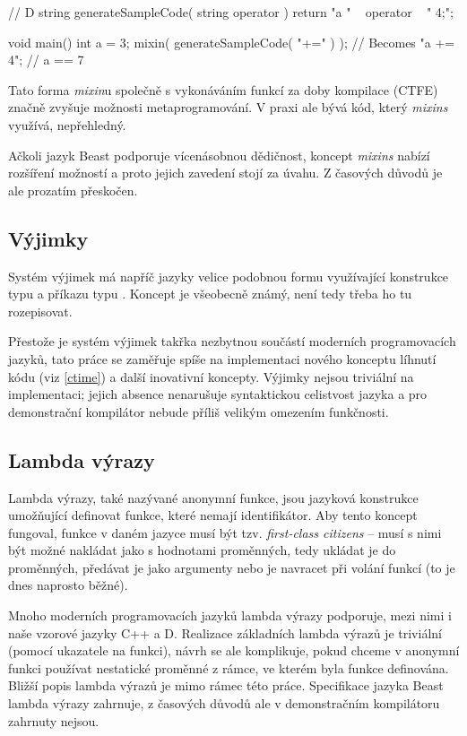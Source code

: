 \begin{dcode}
// D
string generateSampleCode( string operator ) {
	return "a " ~ operator ~ " 4;";
}

void main() {
	int a = 3;
	mixin( generateSampleCode( "+=" ) ); // Becomes "a += 4";
	// a == 7
}
\end{dcode}

Tato forma \textit{mixin}u společně s vykonáváním funkcí za doby kompilace (CTFE) značně zvyšuje možnosti metaprogramování. V praxi ale bývá kód, který \textit{mixins} využívá, nepřehledný.

Ačkoli jazyk Beast podporuje vícenásobnou dědičnost, koncept \textit{mixins} nabízí rozšíření možností a proto jejich zavedení stojí za úvahu. Z časových důvodů je ale prozatím přeskočen.

\subsection{Výjimky}
Systém výjimek má napříč jazyky velice podobnou formu využívající konstrukce typu  a příkazu typu . Koncept je všeobecně známý, není tedy třeba ho tu rozepisovat.

Přestože je systém výjimek takřka nezbytnou součástí moderních programovacích jazyků, tato práce se zaměřuje spíše na implementaci nového konceptu líhnutí kódu (viz \autoref{ctime}) a další inovativní koncepty. Výjimky nejsou triviální na implementaci; jejich absence nenarušuje syntaktickou celistvost jazyka a pro demonstrační kompilátor nebude příliš velikým omezením funkčnosti.

\subsection{Lambda výrazy}
Lambda výrazy, také nazývané anonymní funkce, jsou jazyková konstrukce umožňující definovat funkce, které nemají identifikátor. Aby tento koncept fungoval, funkce v daném jazyce musí být tzv. \textit{first-class citizens} -- musí s nimi být možné nakládat jako s hodnotami proměnných, tedy ukládat je do proměnných, předávat je jako argumenty nebo je navracet při volání funkcí (to je dnes naprosto běžné).

Mnoho moderních programovacích jazyků lambda výrazy podporuje, mezi nimi i naše vzorové jazyky C++ a D. Realizace základních lambda výrazů je triviální (pomocí ukazatele na funkci), návrh se ale komplikuje, pokud chceme v anonymní funkci používat nestatické proměnné z rámce, ve kterém byla funkce definována. Bližší popis lambda výrazů je mimo rámec této práce. Specifikace jazyka Beast lambda výrazy zahrnuje, z časových důvodů ale v demonstračním kompilátoru zahrnuty nejsou.

